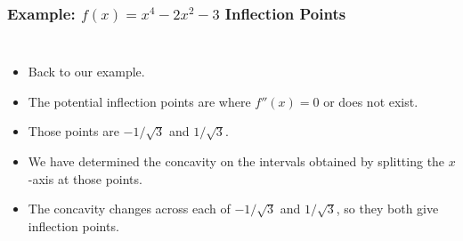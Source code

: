 \documentclass[serif,ignorenonframetext]{beamer}
\begin{document}
\begin{frame}
  \frametitle{Example: $f(x)=x^4-2x^2-3$ Inflection Points}
  \begin{columns}
  \begin{itemize}[<+->]
  \item Back to our example.
  \item The potential inflection points are where $f''(x)=0$ or
    does not exist.
  \item Those points are $-1/\sqrt{3}$ and $1/\sqrt{3}$.
  \item We have determined the concavity on the intervals obtained
    by splitting the $x$-axis at those points.
  \item The concavity changes across each of $-1/\sqrt{3}$ and 
    $1/\sqrt{3}$, so they both give inflection points.
  \end{itemize}

\end{columns}
\end{frame}
\end{document}

